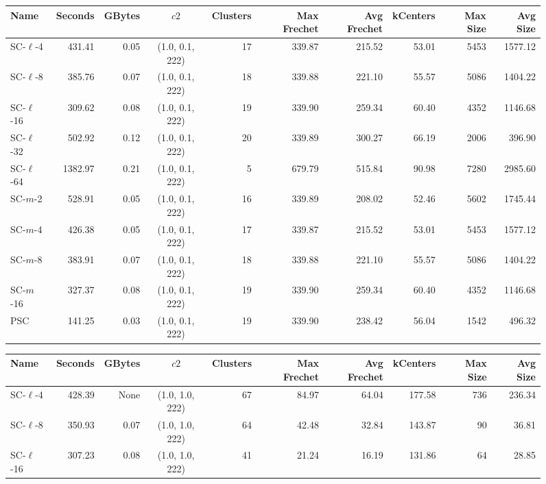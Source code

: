 \begin{figure} \begin{center}
    \begin{minipage}{\textwidth}
    {
    \begin{tabular}{@{}lrrcrrrrrr@{}}
        \toprule
        Name & Seconds & GBytes & $c2$ & Clusters & Max Frechet & Avg Frechet & kCenters & Max Size & Avg Size\\
        \midrule
        SC-$\ell$-4 & 431.41 & 0.05 & (1.0, 0.1, 222) & 17 & 339.87 & 215.52 & 53.01 & 5453 & 1577.12\\
        SC-$\ell$-8 & 385.76 & 0.07 & (1.0, 0.1, 222) & 18 & 339.88 & 221.10 & 55.57 & 5086 & 1404.22\\
        SC-$\ell$-16 & 309.62 & 0.08 & (1.0, 0.1, 222) & 19 & 339.90 & 259.34 & 60.40 & 4352 & 1146.68\\
        SC-$\ell$-32 & 502.92 & 0.12 & (1.0, 0.1, 222) & 20 & 339.89 & 300.27 & 66.19 & 2006 & 396.90\\
        SC-$\ell$-64 & 1382.97 & 0.21 & (1.0, 0.1, 222) & 5 & 679.79 & 515.84 & 90.98 & 7280 & 2985.60\\
        SC-$m$-2 & 528.91 & 0.05 & (1.0, 0.1, 222) & 16 & 339.89 & 208.02 & 52.46 & 5602 & 1745.44\\
        SC-$m$-4 & 426.38 & 0.05 & (1.0, 0.1, 222) & 17 & 339.87 & 215.52 & 53.01 & 5453 & 1577.12\\
        SC-$m$-8 & 383.91 & 0.07 & (1.0, 0.1, 222) & 18 & 339.88 & 221.10 & 55.57 & 5086 & 1404.22\\
        SC-$m$-16 & 327.37 & 0.08 & (1.0, 0.1, 222) & 19 & 339.90 & 259.34 & 60.40 & 4352 & 1146.68\\
        PSC & 141.25 & 0.03 & (1.0, 0.1, 222) & 19 & 339.90 & 238.42 & 56.04 & 1542 & 496.32\\
        \bottomrule
    \end{tabular}}
    {
    \begin{tabular}{@{}lrrcrrrrrr@{}}
        \toprule
        Name & Seconds & GBytes & $c2$ & Clusters & Max Frechet & Avg Frechet & kCenters & Max Size & Avg Size\\
        \midrule
        SC-$\ell$-4 & 428.39 & None & (1.0, 1.0, 222) & 67 & 84.97 & 64.04 & 177.58 & 736 & 236.34\\
        SC-$\ell$-8 & 350.93 & 0.07 & (1.0, 1.0, 222) & 64 & 42.48 & 32.84 & 143.87 & 90 & 36.81\\
        SC-$\ell$-16 & 307.23 & 0.08 & (1.0, 1.0, 222) & 41 & 21.24 & 16.19 & 131.86 & 64 & 28.85\\

\end{tabular}}
\end{minipage}
\end{center}
\end{figure}
